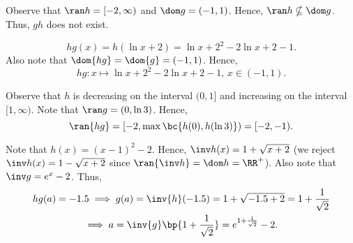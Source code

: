 \begin{solution}
\begin{ppart}
\begin{center}
        \end{center}
    \end{ppart}
    \begin{ppart}
        Observe that $\ran h = [-2, \infty)$ and $\dom g = (-1, 1)$. Hence, $\ran h \nsubseteq \dom g$. Thus, $gh$ does not exist.
    \end{ppart}
    \begin{ppart}
        \[hg(x) = h(\ln{x+2}) = \ln{x+2}^2 - 2\ln{x+2} - 1.\] Also note that $\dom{hg} = \dom{g} = (-1, 1)$. Hence, \[hg \colon x \mapsto \ln{x+2}^2 - 2\ln{x+2} - 1, \, x \in (-1, 1).\]

        Observe that $h$ is decreasing on the interval $(0, 1]$ and increasing on the interval $[1, \infty)$. Note that $\ran g = (0, \ln 3)$. Hence, \[\ran{hg} = [-2, \max \bc{h(0), h(\ln 3)}) = [-2, -1).\]
    \end{ppart}
    \begin{ppart}
        Note that $h(x) = (x-1)^2 -2$. Hence, $\inv h(x) = 1 + \sqrt{x+2}$ (we reject $\inv h(x) = 1 - \sqrt{x+2}$ since $\ran{\inv h} = \dom h = \RR^+$). Also note that $\inv g = e^x - 2$. Thus,
        \begin{gather*}
            hg(a) = -1.5 \implies g(a) = \inv{h}(-1.5) = 1 + \sqrt{-1.5 + 2} = 1 + \frac1{\sqrt{2}}\\
            \implies a = \inv{g}\bp{1 + \frac1{\sqrt{2}}} = e^{1 + \frac1{\sqrt{2}}} - 2.
        \end{gather*}
    \end{ppart}
\end{solution}

